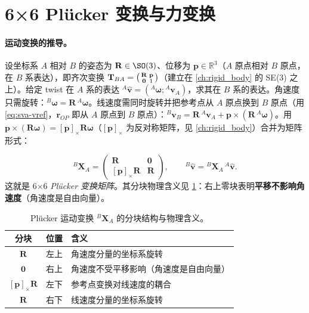 \section{6×6 Plücker 变换与力变换}
\label{sec:sva-transform}

\paragraph{运动变换的推导。}
设坐标系 $A$ 相对 $B$ 的姿态为 $\mathbf R\in\SO(3)$、位移为 $\mathbf p\in\mathbb R^3$（$A$ 原点相对 $B$ 原点，在 $B$ 系表达），即齐次变换 $\mathbf T_{BA}=\begin{psmallmatrix}\mathbf R&\mathbf p\\ \mathbf 0&1\end{psmallmatrix}$（建立在 \cref{ch:rigid_body} 的 SE(3) 之上）。给定 twist 在 $A$ 系的表达 ${}^A\hat{\mathbf v}=({}^A\boldsymbol\omega;{}^A\mathbf v_A)$，求其在 $B$ 系的表达。角速度只需旋转：${}^B\boldsymbol\omega=\mathbf R\,{}^A\boldsymbol\omega$。线速度需同时旋转并把参考点从 $A$ 原点换到 $B$ 原点（用 \cref{eq:sva-vref}，$\mathbf r_{OP}$ 即从 $A$ 原点到 $B$ 原点）：${}^B\mathbf v_B=\mathbf R\,{}^A\mathbf v_A+\mathbf p\times(\mathbf R\,{}^A\boldsymbol\omega)$。用 $\mathbf p\times(\mathbf R\boldsymbol\omega)=[\mathbf p]_\times\mathbf R\boldsymbol\omega$（$[\mathbf p]_\times$ 为反对称矩阵，见 \cref{ch:rigid_body}）合并为矩阵形式：

\begin{equation}
  {}^B\mathbf X_A=\begin{pmatrix}\mathbf R&\mathbf 0\\ [\mathbf p]_\times\mathbf R&\mathbf R\end{pmatrix},
  \qquad {}^B\hat{\mathbf v}={}^B\mathbf X_A\,{}^A\hat{\mathbf v}.
  \label{eq:sva-X}
\end{equation}
这就是 6×6 \emph{Plücker 变换矩阵}。其分块物理含义见 \cref{tab:sva-Xblocks}：右上零块表明\textbf{平移不影响角速度}（角速度是自由向量）。

\begin{table}[H]\centering\small
\caption{Plücker 运动变换 ${}^B\mathbf X_A$ 的分块结构与物理含义。}
\label{tab:sva-Xblocks}
\begin{tabular}{cll}
\toprule
分块 & 位置 & 含义 \\
\midrule
$\mathbf R$ & 左上 & 角速度分量的坐标系旋转 \\
$\mathbf 0$ & 右上 & 角速度不受平移影响（角速度是自由向量） \\
$[\mathbf p]_\times\mathbf R$ & 左下 & 参考点变换对线速度的耦合 \\
$\mathbf R$ & 右下 & 线速度分量的坐标系旋转 \\
\bottomrule
\end{tabular}
\end{table}

